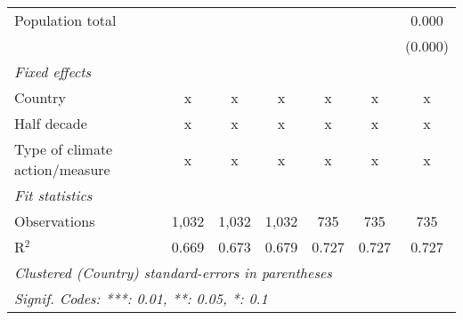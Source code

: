 \begin{tabular}{lcccccc}
   Population total                                                        &         &                &                &                &                & 0.000\\   
                                                                           &         &                &                &                &                & (0.000)\\   
   \emph{Fixed effects}\\
   Country                                                                 & x       & x              & x              & x              & x              & x\\  
   Half decade                                                             & x       & x              & x              & x              & x              & x\\  
   Type of climate action/measure                                          & x       & x              & x              & x              & x              & x\\  
   \midrule \emph{Fit statistics}\\
   Observations                                                            & 1,032   & 1,032          & 1,032          & 735            & 735            & 735\\  
   R$^2$                                                                   & 0.669   & 0.673          & 0.679          & 0.727          & 0.727          & 0.727\\  
   \midrule
   \multicolumn{7}{l}{\emph{Clustered (Country) standard-errors in parentheses}}\\
   \multicolumn{7}{l}{\emph{Signif. Codes: ***: 0.01, **: 0.05, *: 0.1}}\\
\end{tabular}
\par\endgroup


